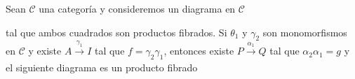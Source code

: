 \documentclass[tesis]{subfiles}
\begin{document}
\begin{Prop}\label{Mendoza-Ejer.9}
    Sean $\mathscr{C}$ una categoría y consideremos un diagrama en $\mathscr{C}$
    \begin{center}
    \end{center}
    tal que ambos cuadrados son productos fibrados. Si $\theta_1$ y $\gamma_2$ son monomorfismos en $\mathscr{C}$ y existe $A\xrightarrow[]{\gamma_1} I$ tal que $f = \gamma_2\gamma_1$, entonces existe $P\xrightarrow[]{\alpha_1} Q$ tal que $\alpha_2\alpha_1=g$ y el siguiente diagrama es un producto fibrado

    \begin{center}
    \end{center}
\end{Prop}
\end{document}

